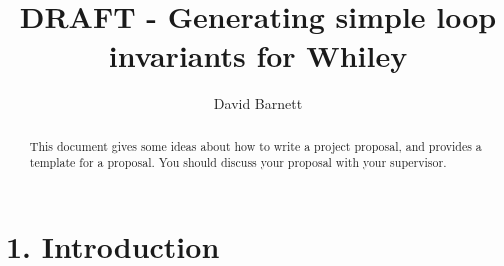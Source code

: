 \documentclass[11pt, a4paper, twoside, openright]{report}
\title{DRAFT - Generating simple loop invariants for Whiley}
\author{David Barnett}
\date{}
\begin{document}
\frontmatter


\begin{abstract}
    This document gives some ideas about how to write a project
    proposal, and provides a template for a proposal. You should discuss
    your proposal with your supervisor.
\end{abstract}


\maketitle




\mainmatter


%

\section*{1. Introduction}
\end{document}
